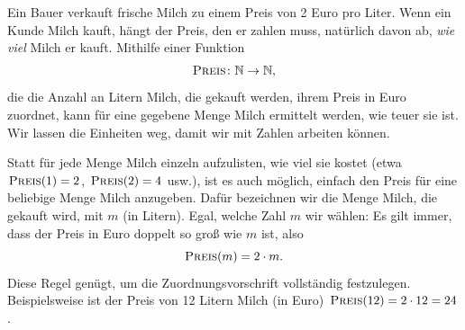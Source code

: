 \documentclass[../../main.tex]{subfiles}
\begin{document}
\begin{example}{}

    Ein Bauer verkauft frische Milch zu einem Preis von 2 Euro pro Liter. Wenn ein Kunde Milch kauft, hängt der Preis, den er zahlen muss, natürlich davon ab, \emph{wie viel} Milch er kauft. Mithilfe einer Funktion \[\textsc{Preis}\colon\mathbb{N}\rightarrow\mathbb{N},\] die die Anzahl an Litern Milch, die gekauft werden, ihrem Preis in Euro zuordnet, kann für eine gegebene Menge Milch ermittelt werden, wie teuer sie ist. Wir lassen die Einheiten weg, damit wir mit Zahlen arbeiten können.
    
    Statt für jede Menge Milch einzeln aufzulisten, wie viel sie kostet (etwa \mbox{$\textsc{Preis}(1)=2$}, $\textsc{Preis}(2)=4$ usw.), ist es auch möglich, einfach den Preis für eine beliebige Menge Milch anzugeben. Dafür bezeichnen wir die Menge Milch, die gekauft wird, mit $m$ (in Litern). Egal, welche Zahl $m$ wir wählen: Es gilt immer, dass der Preis in Euro doppelt so groß wie $m$ ist, also \[\textsc{Preis}(m)=2\cdot m.\]
    Diese Regel genügt, um die Zuordnungsvorschrift vollständig festzulegen. Beispielsweise ist der Preis von 12 Litern Milch (in Euro) \mbox{$\textsc{Preis}(12)=2\cdot 12=24$}.
\end{example}
\end{document}
